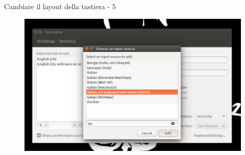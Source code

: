 \begin{frame}{Cambiare il layout della tastiera - 5}

\begin{figure}
\centering
\includegraphics[scale=0.31]{res/img/5}
\end{figure}

\end{frame}